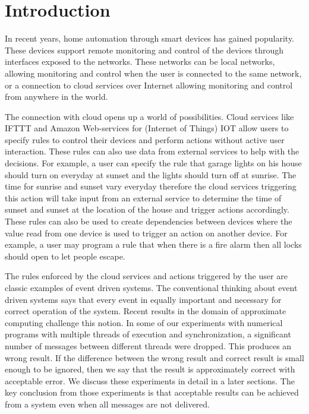 \section{Introduction}
In recent years, home automation through smart devices has gained popularity. These devices support remote monitoring and control of the devices through interfaces exposed to the networks. These networks can be local networks, allowing monitoring and control when the user is connected to the same network, or a connection to cloud services over Internet allowing monitoring and control from anywhere in the world.

The connection with cloud opens up a world of possibilities. Cloud services like IFTTT and Amazon Web-services for (Internet of Things) IOT allow users to specify rules to control their devices and perform actions without active user interaction. These rules can also use data from external services to help with the decisions. For example, a user can specify the rule that garage lights on his house should turn on everyday at sunset and the lights should turn off at sunrise. The time for sunrise and sunset vary everyday therefore the cloud services triggering this action will take input from an external service to determine the time of sunset and sunset at the location of the house and trigger actions accordingly. These rules can also be used to create dependencies between devices where the value read from one device is used to trigger an action on another device. For example, a user may program a rule that when there is a fire alarm then all locks should open to let people escape.

The rules enforced by the cloud services and actions triggered by the user are classic examples of event driven systems. The conventional thinking about event driven systems says that every event in equally important and necessary for correct operation of the system. Recent results in the domain of approximate computing challenge this notion. In some of our experiments with numerical programs with multiple threads of execution and synchronization, a significant number of messages between different threads were dropped. This produces an wrong result. If the difference between the wrong result and correct result is small enough to be ignored, then we say that the result is approximately correct with acceptable error. We discuss these experiments in detail in a later sections. The key conclusion from those experiments is that acceptable results can be achieved from a system even when all messages are not delivered.

